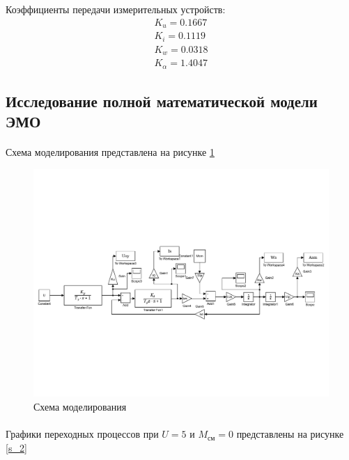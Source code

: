 \documentclass[a4paper,12pt]{article}
\begin{document}
	\noindent Коэффициенты передачи измерительных устройств:\\
	
	
	\begin{gather}
	K_u=0.1667\\
	K_i=0.1119\\
	K_w=0.0318\\
	K_\alpha=1.4047
	\end{gather}
	\newpage
	\begin{center}			
	\section{Исследование полной математической модели ЭМО}
	\end{center}
		\paragraph {} Схема моделирования представлена на рисунке \ref{s_1}
		
		\begin{figure}[h]
			\renewcommand{\figurename}{Рисунок}
			\centering
			\includegraphics[width=6in]{Lab10full.pdf}
			\caption{Схема моделирования}
			\label{s_1}
		\end{figure}
	\paragraph {} Графики переходных процессов при $U=5$ и $M_{\text{см}}=0$ представлены на рисунке \ref{s_2}
	
\end{document}
